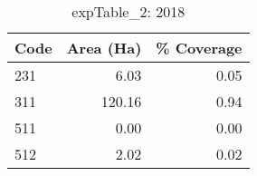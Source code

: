 \begin{table}[ht]
\centering
\begin{tabular}{lrr}
  \hline
Code & Area (Ha) & \% Coverage \\ 
  \hline
231 & 6.03 & 0.05 \\ 
  311 & 120.16 & 0.94 \\ 
  511 & 0.00 & 0.00 \\ 
  512 & 2.02 & 0.02 \\ 
   \hline
\end{tabular}
\caption{expTable\_2: 2018} 
\end{table}
